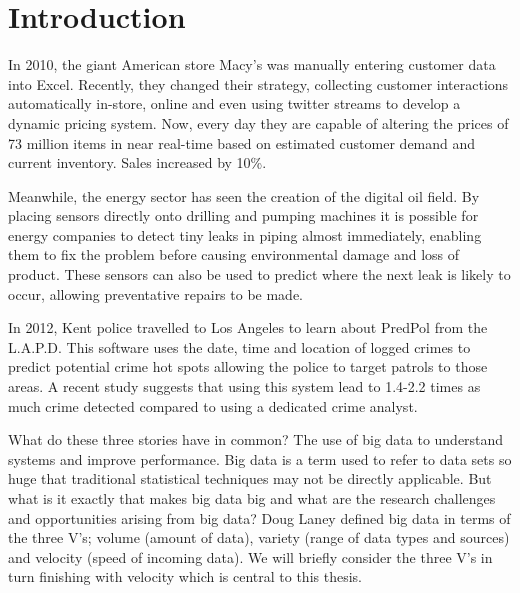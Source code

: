 %							

%								

\chapter{Introduction}


In 2010, the giant American store Macy's was manually entering customer data into Excel.  Recently, they changed their strategy, collecting customer interactions automatically in-store, online and even using twitter streams to develop a dynamic pricing system. Now, every day they are capable of altering the prices of 73 million items in near real-time based on estimated customer demand and current inventory. Sales increased by 10\%.

Meanwhile, the energy sector has seen the creation of the digital oil field. By placing sensors directly onto drilling and pumping machines it is possible for energy companies to detect tiny leaks in piping almost immediately, enabling them to fix the problem before causing environmental damage and loss of product. These sensors can also be used to predict where the next leak is likely to occur, allowing  preventative repairs to be made.

In 2012, Kent police travelled to Los Angeles to learn about PredPol from the L.A.P.D. This software uses the date, time and location of logged crimes to predict potential crime hot spots allowing the police to target patrols to those areas. A recent study \citep{Mohler2015} suggests that using this system lead to 1.4-2.2 times as much crime detected compared to using a dedicated crime analyst. %

What do these three stories have in common? The use of big data to understand systems and improve performance. Big data \citep{Buhlmann2016} is a term used to refer to data sets so huge that traditional statistical techniques may not be directly applicable. But what is it exactly that makes big data big and what are the research challenges and opportunities arising from big data? Doug Laney defined big data in terms of the three V's; volume (amount of data), variety (range of data types and sources) and velocity (speed of incoming data). We will briefly consider the three V's in turn finishing with velocity which is central to this thesis. 

